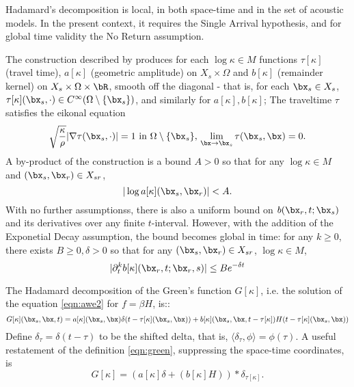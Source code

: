 Hadamard's decomposition is local, in both space-time and in the set of
acoustic models. In the present context, it requires the Single
Arrival hypothesis, and for global time validity the No Return
assumption. 

The construction described by \cite{Friedlander:75} produces for each $\log \kappa \in M$ functions $\tau[\kappa]$ (travel time), $a[\kappa]$
(geometric amplitude) on $X_s \times \Omega$ and $b[\kappa]$
(remainder kernel) on $X_s \times \Omega \times \bR$, smooth off the
diagonal - that is, for each $\bx_s \in X_s$, $\tau[\kappa](\bx_s,\cdot) \in C^{\infty}(\Omega \setminus
  \{\bx_s\})$, and similarly for $a[\kappa],b[\kappa]$; The traveltime $\tau$
  satisfies the eikonal equation
  \[
    \sqrt{\frac{\kappa}{\rho}} |\nabla \tau(\bx_s,\cdot)| = 1 \mbox{ in } \Omega \setminus
    \{\bx_s\}, \, \lim_{\bx \rightarrow \bx_s} \tau(\bx_s,\bx) = 0.
  \]
A by-product of the construction is a bound $A>0$ so that for any $\log \kappa \in M$
and $(\bx_s,\bx_r) \in X_{sr}$,
\begin{equation}
  \label{eqn:aest}
  |\log a[\kappa](\bx_s,\bx_r)| <  A.
\end{equation}
With no further assumptionss, there is also a uniform bound on
$b(\bx_r,t;\bx_s)$ and
its derivatives over any finite $t$-interval. However, with the
addition of the Exponetial Decay assumption, the bound becomes
global in time: for any $k \ge 0$, there exists $B \ge 0,\delta > 0$
so that for any $(\bx_s,\bx_r) \in X_{sr}$, $\log \kappa \in M$,
\begin{equation}
  |\partial^k_t b[\kappa](\bx_r,t;\bx_r,s)| \le B e^{-\delta t}
  \label{eqn:best}
\end{equation}

The Hadamard
decomposition of the Green's function $G[\kappa]$, i.e. the solution of the
equation \ref{eqn:awe2} for $f = \beta H$, is::
\begin{equation}
  \label{eqn:green}
  G[\kappa](\bx_s,\bx,t) = a[\kappa](\bx_s,\bx)\delta(t - \tau[\kappa](\bx_s,\bx)) +
  b[\kappa](\bx_s,\bx,t-\tau[\kappa])H(t - \tau[\kappa](\bx_s,\bx))
\end{equation}
Define $\delta_{\tau} = \delta(t-\tau)$ to be the shifted delta, that
is, $\langle \delta_{\tau},\phi\rangle = \phi(\tau)$. A useful
restatement of the definition \ref{eqn:green}, suppressing the
space-time coordinates, is
\begin{equation}
  \label{eqn:regreen}
  G[\kappa] = (a[\kappa]\delta +  (b[\kappa]H))*\delta_{\tau[\kappa]}.
\end{equation}

